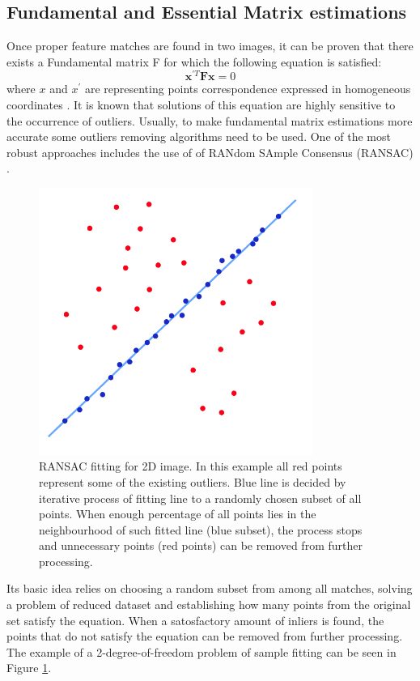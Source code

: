 \subsection{Fundamental and Essential Matrix estimations}
Once proper feature matches are found in two images, it can be proven that there exists a Fundamental matrix F for which the following equation is satisfied:
\begin{equation} \label{eq:fundamntalEquation}
\textbf{x}^{'T} \textbf{F} \textbf{x} = 0
\end{equation} 
where $x$ and ${x}^{'}$ are representing points correspondence expressed in homogeneous coordinates \cite{HartleyMultipleView}. It is known that solutions of this equation are highly sensitive to the occurrence of outliers. Usually, to make fundamental matrix estimations more accurate some outliers removing algorithms need to be used. One of the most robust approaches includes the use of of RANdom SAmple Consensus (RANSAC) \cite{website:ransac}.
\begin{figure}[h!]
    \centering
    \includegraphics[width=0.8\textwidth]{RANSACFitting}
    \caption[RANSAC fitting for 2D image]{RANSAC fitting for 2D image\cite{website:ransac}. In this example all red points represent some of the existing outliers. Blue line is decided by iterative process of fitting line to a randomly chosen subset of all points. When enough percentage of all points lies in the neighbourhood of such fitted line (blue subset), the process stops and unnecessary points (red points) can be removed from further processing.}
    \label{fig:RANSACFitting}
\end{figure}
Its basic idea relies on choosing a random subset from among all matches, solving a problem of reduced dataset and establishing how many points from the original set satisfy the equation. When a satosfactory amount of inliers is found, the points that do not satisfy the equation can be removed from further processing. The example of a 2-degree-of-freedom problem of sample fitting can be seen in Figure \ref{fig:RANSACFitting}. \\

